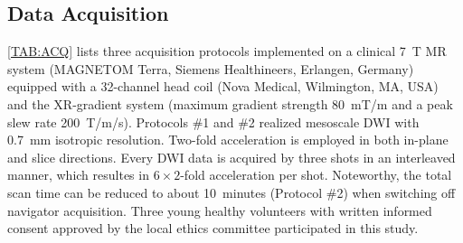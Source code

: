 \documentclass[journal,twoside,web]{ieeecolor}
\begin{document}
\begin{table}
	\end{table}

	\subsection{Data Acquisition}

	\cref{TAB:ACQ} lists three acquisition protocols implemented on
	a clinical \SI{7}{\tesla} MR system
	(MAGNETOM Terra, Siemens Healthineers, Erlangen, Germany)
	equipped with a 32-channel head coil (Nova Medical, Wilmington, MA, USA)
	and the XR-gradient system
	(maximum gradient strength \SI{80}{\milli\tesla/\meter} and
	a peak slew rate \SI{200}{\tesla/\meter/\second}).
	Protocols \#1 and \#2 realized mesoscale DWI with \SI{0.7}{mm}
	isotropic resolution. Two-fold acceleration is employed
	in both in-plane and slice directions.
	Every DWI data is acquired by three shots in an interleaved manner,
	which resultes in $6 \times 2$-fold acceleration per shot.
	Noteworthy, the total scan time can be reduced to about 10~minutes
	(Protocol \#2) when switching off navigator acquisition.
	Three young healthy volunteers with written informed consent
	approved by the local ethics committee
	participated in this study.
\end{document}
